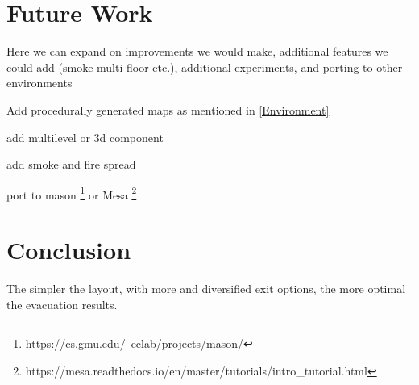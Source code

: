 \documentclass[12pt,letterpaper]{article}
\begin{document}
%
%
\section{Future Work}
Here we can expand on improvements we would make, additional features we could add (smoke multi-floor etc.), additional experiments, and porting to other environments

Add procedurally generated maps as mentioned in \ref{Environment}

add multilevel or 3d component

add smoke and fire spread

port to mason \footnote{https://cs.gmu.edu/~eclab/projects/mason/} or Mesa \footnote{https://mesa.readthedocs.io/en/master/tutorials/intro\_tutorial.html}

\section {Conclusion}

The simpler the layout, with more and diversified exit options, the more optimal
the evacuation results.




\end{document}
